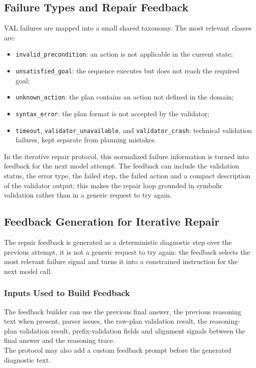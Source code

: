 \subsection{Failure Types and Repair Feedback}

VAL failures are mapped into a small shared taxonomy. The most relevant classes
are:

\begin{itemize}
    \item \texttt{invalid\_precondition}: an action is not applicable in the
    current state;
    \item \texttt{unsatisfied\_goal}: the sequence executes but does not reach
    the required goal;
    \item \texttt{unknown\_action}: the plan contains an action not defined in
    the domain;
    \item \texttt{syntax\_error}: the plan format is not accepted by the
    validator;
    \item \texttt{timeout}, \texttt{validator\_unavailable}, and
    \texttt{validator\_crash}: technical validation failures, kept separate
    from planning mistakes.
\end{itemize}

In the iterative repair protocol, this normalized failure information is turned
into feedback for the next model attempt. The feedback can include the validation
status, the error type, the failed step, the failed action and a compact
description of the validator output; this makes the repair loop grounded in
symbolic validation rather than in a generic request to try again.

\subsection{Feedback Generation for Iterative Repair}

The repair feedback is generated as a deterministic diagnostic step over the
previous attempt, it is not a generic request to try again: the feedback selects
the most relevant failure signal and turns it into a constrained instruction for
the next model call.

\subsubsection{Inputs Used to Build Feedback}

The feedback builder can use the previous final answer, the previous reasoning
text when present, parser issues, the raw-plan validation result, the
reasoning-plan validation result, prefix-validation fields and alignment
signals between the final answer and the reasoning trace.\\
The protocol may also add a custom feedback prompt before the generated diagnostic text.

